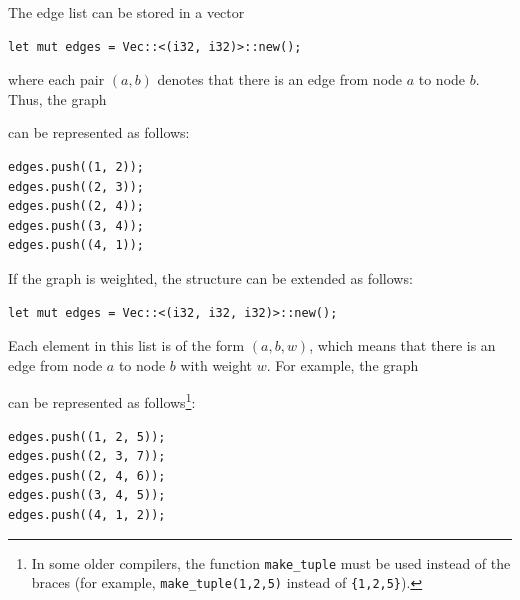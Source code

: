 The edge list can be stored in a vector
\begin{lstlisting}
let mut edges = Vec::<(i32, i32)>::new();
\end{lstlisting}
where each pair $(a,b)$ denotes that
there is an edge from node $a$ to node $b$.
Thus, the graph

\begin{center}
\end{center}
can be represented as follows:
\begin{lstlisting}
edges.push((1, 2));
edges.push((2, 3));
edges.push((2, 4));
edges.push((3, 4));
edges.push((4, 1));
\end{lstlisting}

\noindent
If the graph is weighted, the structure can
be extended as follows:
\begin{lstlisting}
let mut edges = Vec::<(i32, i32, i32)>::new();
\end{lstlisting}
Each element in this list is of the
form $(a,b,w)$, which means that there
is an edge from node $a$ to node $b$ with weight $w$.
For example, the graph

\begin{center}
\end{center}
\begin{samepage}
can be represented as follows\footnote{In some older compilers, the function
\texttt{make\_tuple} must be used instead of the braces (for example,
\texttt{make\_tuple(1,2,5)} instead of \texttt{\{1,2,5\}}).}:
\begin{lstlisting}
edges.push((1, 2, 5));
edges.push((2, 3, 7));
edges.push((2, 4, 6));
edges.push((3, 4, 5));
edges.push((4, 1, 2));
\end{lstlisting}
\end{samepage}
